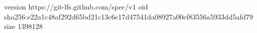 version https://git-lfs.github.com/spec/v1
oid sha256:e22a1c48af292d65bd21c13c6e17d47541da08927a00ef83556a5933dd5afd79
size 1398128
